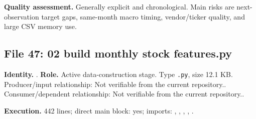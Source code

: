 \documentclass[
  11pt,
  a4paper]{article}
\begin{document}
\textbf{Quality assessment.} Generally explicit and chronological. Main
risks are next-observation target gaps, same-month macro timing,
vendor/ticker quality, and large CSV memory use.

\subsection{File 47: 02 build monthly stock
features.py}\label{file-2486773857604183825}

\textbf{Identity.} .
\textbf{Role.} Active data-construction stage. Type \texttt{.py}, size
12.1 KB. Producer/input relationship: Not verifiable from the current
repository.. Consumer/dependent relationship: Not verifiable from the
current repository..

\textbf{Execution.} 442 lines; direct main block: yes; imports:
, , ,
,
.
\end{document}
